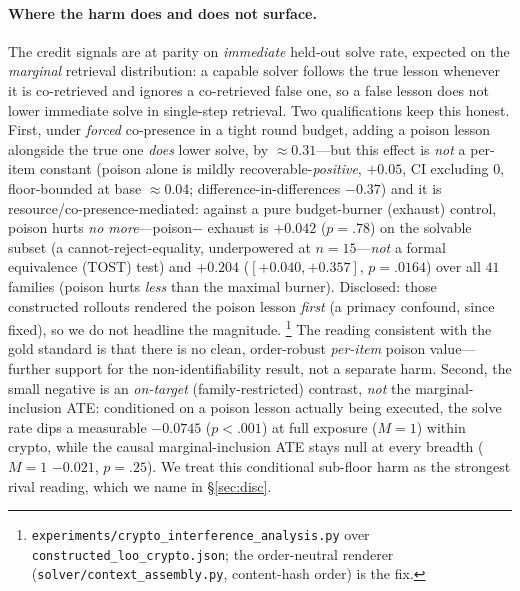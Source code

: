 \paragraph{Where the harm does and does not surface.} The credit signals are at parity
on \emph{immediate} held-out solve rate, expected on the \emph{marginal} retrieval
distribution: a capable solver follows the true lesson whenever it is co-retrieved and
ignores a co-retrieved false one, so a false lesson does not lower immediate solve in
single-step retrieval. Two qualifications keep this honest. First, under \emph{forced}
co-presence in a tight round budget, adding a poison lesson alongside the true one
\emph{does} lower solve, by ${\approx}0.31$---but this effect is \emph{not} a per-item
constant (poison alone is mildly recoverable-\emph{positive}, $+0.05$, CI excluding $0$,
floor-bounded at base ${\approx}0.04$;
difference-in-differences $-0.37$) and it is resource/co-presence-mediated: against a
pure budget-burner (\textsf{exhaust}) control, poison hurts \emph{no more}---poison$-$%
\textsf{exhaust} is $+0.042$ ($p{=}.78$) on the solvable subset (a cannot-reject-equality,
underpowered at $n{=}15$---\emph{not} a formal equivalence (TOST) test) and $+0.204$
($[+0.040,+0.357]$, $p{=}.0164$) over all $41$ families (poison hurts \emph{less}
than the maximal burner). Disclosed:
those constructed rollouts rendered the poison lesson \emph{first} (a primacy confound,
since fixed), so we do not headline the magnitude.%
\footnote{\texttt{experiments/crypto\_interference\_analysis.py} over
\texttt{constructed\_loo\_crypto.json}; the order-neutral renderer
(\texttt{solver/context\_assembly.py}, content-hash order) is the fix.}
The reading consistent with the gold standard is that there is no clean, order-robust
\emph{per-item} poison value---further support for the non-identifiability result, not a
separate harm. Second, the small negative is an \emph{on-target} (family-restricted)
contrast, \emph{not} the marginal-inclusion ATE: conditioned on a poison lesson actually
being executed, the solve rate dips a measurable $-0.0745$ ($p<.001$) at full exposure
($M{=}1$) within crypto, while the causal marginal-inclusion ATE stays null at every
breadth ($M{=}1$ $-0.021$, $p{=}.25$). We treat this conditional sub-floor harm as the
strongest rival reading, which we name in
\S\ref{sec:disc}.

